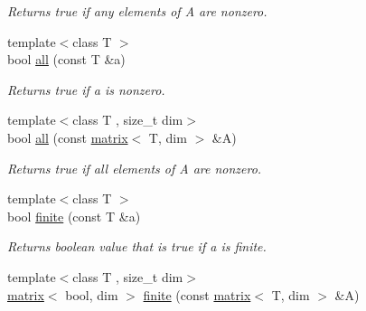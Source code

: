 \begin{DoxyCompactItemize}
\begin{DoxyCompactList}\small\item\em Returns true if any elements of A are nonzero. \end{DoxyCompactList}\item 
\hypertarget{namespacekeycpp_aab77d82d9cc7d1fcca87967048f09e0e}{{\footnotesize template$<$class T $>$ }\\bool \hyperlink{namespacekeycpp_aab77d82d9cc7d1fcca87967048f09e0e}{all} (const T \&a)}\label{namespacekeycpp_aab77d82d9cc7d1fcca87967048f09e0e}

\begin{DoxyCompactList}\small\item\em Returns true if a is nonzero. \end{DoxyCompactList}\item 
\hypertarget{namespacekeycpp_a30bc3707493ba61f2165a189e7cbafd4}{{\footnotesize template$<$class T , size\-\_\-t dim$>$ }\\bool \hyperlink{namespacekeycpp_a30bc3707493ba61f2165a189e7cbafd4}{all} (const \hyperlink{classkeycpp_1_1matrix}{matrix}$<$ T, dim $>$ \&A)}\label{namespacekeycpp_a30bc3707493ba61f2165a189e7cbafd4}

\begin{DoxyCompactList}\small\item\em Returns true if all elements of A are nonzero. \end{DoxyCompactList}\item 
\hypertarget{namespacekeycpp_ac60465b61314a3baea857cf9d3579524}{{\footnotesize template$<$class T $>$ }\\bool \hyperlink{namespacekeycpp_ac60465b61314a3baea857cf9d3579524}{finite} (const T \&a)}\label{namespacekeycpp_ac60465b61314a3baea857cf9d3579524}

\begin{DoxyCompactList}\small\item\em Returns boolean value that is true if a is finite. \end{DoxyCompactList}\item 
\hypertarget{namespacekeycpp_a047f1d1e201235ae75156016fc5b7edf}{{\footnotesize template$<$class T , size\-\_\-t dim$>$ }\\\hyperlink{classkeycpp_1_1matrix}{matrix}$<$ bool, dim $>$ \hyperlink{namespacekeycpp_a047f1d1e201235ae75156016fc5b7edf}{finite} (const \hyperlink{classkeycpp_1_1matrix}{matrix}$<$ T, dim $>$ \&A)}\label{namespacekeycpp_a047f1d1e201235ae75156016fc5b7edf}


\end{DoxyCompactItemize}
